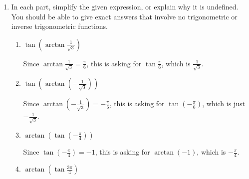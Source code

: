 \documentclass{article}
\begin{document}
\begin{enumerate}[topsep=0pt]
\begin{enumerate}
  \item In each part, simplify the given expression, or explain why it is
    undefined.  You should be able to give exact answers that involve no
    trigonometric or inverse trigonometric functions.
      \begin{enumerate}
      \item
        \begin{problem}[1.5in]
          $\tan\! \left(\arctan \frac{1}{\sqrt{3}} \right)$
        \end{problem}

        \begin{solution}
          Since $\arctan\! \frac{1}{\sqrt{3}} = \frac{\pi}{6}$, this is
          asking for $\tan \frac{\pi}{6}$, which is
          $\boxed{\frac{1}{\sqrt{3}}}$.  
        \end{solution}

      \item
        \begin{problem}
          $\tan\! \left( \arctan\!\left(-\frac{1}{\sqrt3}\right) \right)$
        \end{problem}

        \begin{solution}
          Since $\arctan\!\left(-\frac{1}{\sqrt3}\right) = - \frac{\pi}{6}$,
          this is asking for $\tan \left( - \frac{\pi}{6} \right)$, which
          is just $\boxed{-\frac{1}{\sqrt{3}}}$. 
        \end{solution}

        \probonly{\columnbreak}


      \item
        \begin{problem}[1.5in]
          $\arctan\! \left(\tan\! \left( - \frac{\pi}{4} \right) \right)$
        \end{problem}

        \begin{solution}
          Since $\tan\! \left( - \frac{\pi}{4} \right) = -1$, this is asking
          for $\arctan(-1)$, which is $\boxed{- \frac{\pi}{4}}$. 
        \end{solution}

      \item
        \begin{problem}
          $\arctan\! \left(\tan \frac{3 \pi}{4} \right)$
        \end{problem}


\end{enumerate}
\end{enumerate}
\end{enumerate}
\end{document}
